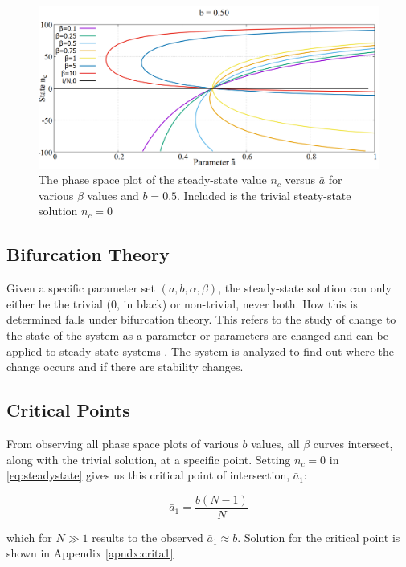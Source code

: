 \begin{figure}
 \centering
  \includegraphics[width=\linewidth]{images/chapter3/phaseSpace.png}
  \caption{The phase space plot of the steady-state value $n_{c}$ versus $\bar{a}$ for various $\beta$ values and $b = 0.5$. Included is the trivial steaty-state solution $n_{c} = 0$}
  \label{fig:phaseSpace}
\end{figure}

\subsection{Bifurcation Theory}
\hspace{\parindent}Given a specific parameter set $(a,b,\alpha,\beta)$, the steady-state solution can only either be the trivial ($0$, in black) or non-trivial, never both. How this is determined falls under bifurcation theory. 
This refers to the study of change to the state of the system as a parameter or parameters are changed and can be applied to steady-state systems \cite{bifurcation}.
The system is analyzed to find out where the change occurs and if there are stability changes.


\subsection{Critical Points}
\hspace{\parindent}From observing all phase space plots of various $b$ values, all $\beta$ curves intersect, along with the trivial solution, at a specific point.
Setting $n_{c} = 0$ in \eqref{eq:steadystate} gives us this critical point of intersection, $\bar{a}_{1}$:

\begin{equation}
\bar{a}_{1} = \frac{b(N-1)}{N}
\end{equation}

which for $N\gg1$ results to the observed $\bar{a}_{1}\approx b$. Solution for the critical point is shown in Appendix \ref{apndx:crita1}

